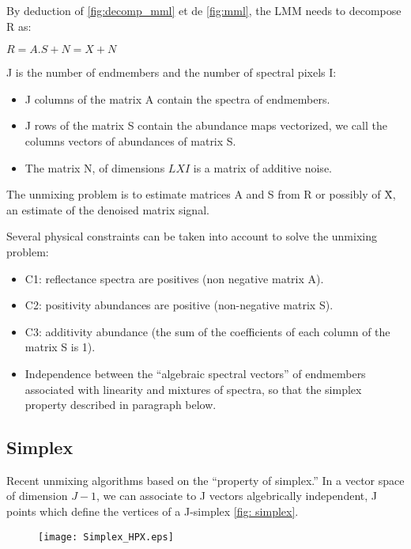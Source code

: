 By deduction of \ref{fig:decomp_mml} et de \ref{fig:mml}, the LMM needs to decompose R as: 
\begin{center}
$R= A.S + N = X + N$
\end{center}

J is the number of endmembers and the number of spectral pixels I:
 
\begin{itemize}
\item{J columns of the matrix A contain the spectra of endmembers.}
\item{J rows of the matrix S contain the abundance maps
vectorized, we call the columns vectors of abundances of
matrix S.}
\item{The matrix N, of dimensions $LXI$ is a matrix of additive noise.}
\end{itemize}

The unmixing problem is to estimate matrices A and S
from R or possibly of \"X, an estimate of the denoised matrix signal.

Several physical constraints can be taken into
account to solve the unmixing problem:
 
\begin{itemize}
\item{C1: reflectance spectra are positives (non negative matrix A).}
\item{C2: positivity abundances are positive (non-negative matrix S).}
\item{C3: additivity
abundance (the sum of the coefficients of each column of the matrix S is 1).}
\item{Independence between the ``algebraic spectral vectors'' of endmembers associated with linearity and mixtures of spectra, so that the simplex property described in paragraph below.}
\end{itemize}

\subsection{Simplex}  
Recent unmixing algorithms based on the ``property of
simplex.'' In a vector space of dimension $J-1$, we can
associate to J vectors algebrically independent, J points which define the vertices of a J-simplex \ref{fig: simplex}.

\begin{figure}[h]
  \centering
  \texttt{[image: Simplex\_HPX.eps]}
  \label{fig:simplex}
\end{figure}

